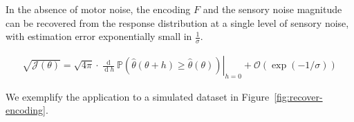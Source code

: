 \begin{thm}\label{lemma:f-exact}
    In the absence of motor noise, the encoding $F$ and the sensory noise magnitude can be recovered from the response distribution at a single level of sensory noise, with estimation error exponentially small in $\frac{1}{\sigma}$. 

\begin{align*}
 \sqrt{\mathcal{J}(\theta)} = \sqrt{4\pi} \cdot \left.\frac{\operatorname{d}}{\operatorname{d}h} \mathbb{P}(\widehat{\theta}(\theta+h) \geq \widehat{\theta}(\theta))\right|_{h=0} + \mathcal{O}(\exp(-1/\sigma))
\end{align*}
    
\end{thm}
We exemplify the application to a simulated dataset in Figure~\ref{fig:recover-encoding}.
